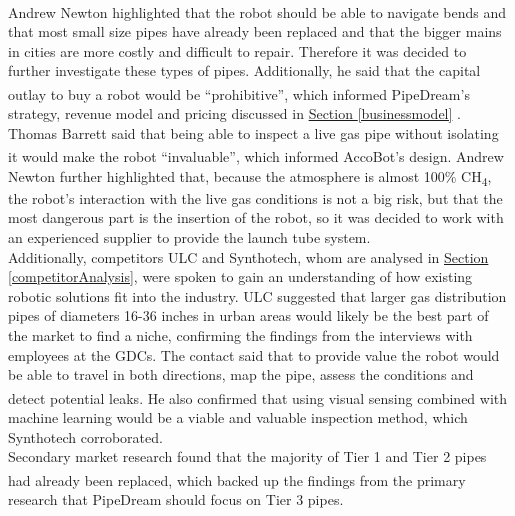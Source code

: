 \documentclass[11pt]{article}		%
\newcommand{\supercite}[1]{\textsuperscript{\cite{#1}}}		%
\newcommand{\sectref}[1]{\hyperref[#1]{Section \ref*{#1}}}     %
\begin{document}
	        \\
            \hspace*{2ex}Andrew Newton highlighted that the robot should be able to navigate bends and that most small size pipes have already been replaced and that the bigger mains in cities are more costly and difficult to repair. Therefore it was decided to further investigate these types of pipes. Additionally, he said that the capital outlay to buy a robot would be “prohibitive”\supercite{Newton}, which informed PipeDream's strategy, revenue model and pricing discussed in \sectref{businessmodel} .%
	        \\
            \hspace*{2ex}Thomas Barrett said that being able to inspect a live gas pipe without isolating it would make the robot “invaluable”\supercite{Barret}, which informed AccoBot's design. Andrew Newton further highlighted that, because the atmosphere is almost 100\% CH\textsubscript{4}, the robot’s interaction with the live gas conditions is not a big risk, but that the most dangerous part is the insertion of the robot, so it was decided to work with an experienced supplier to provide the launch tube system.
	        \\
            \hspace*{2ex}Additionally, competitors ULC and Synthotech, whom are analysed in \sectref{competitorAnalysis}, were spoken to gain an understanding of how existing robotic solutions fit into the industry. ULC suggested that larger gas distribution pipes of diameters 16-36 inches in urban areas would likely be the best part of the market to find a niche, confirming the findings from the interviews with employees at the GDCs. The contact said that to provide value the robot would be able to travel in both directions, map the pipe, assess the conditions and detect potential leaks\supercite{ULC_interview}. He also confirmed that using visual sensing combined with machine learning would be a viable and valuable inspection method, which Synthotech corroborated. %
	        \\
            \hspace*{2ex}Secondary market research found that the majority of Tier 1 and Tier 2 pipes had already been replaced\supercite{SGN-GD2}, which backed up the findings from the primary research that PipeDream should focus on Tier 3 pipes. 
            \\
\end{document}
